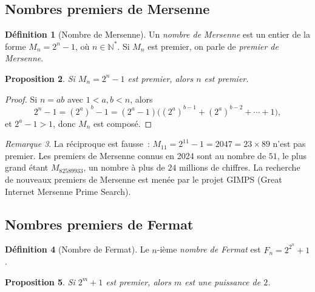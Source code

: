 \documentclass[12pt,a4paper,openany]{book}
\theoremstyle{definition}
\newtheorem{definition}{Définition}[chapter]
\theoremstyle{plain}
\newtheorem{proposition}[definition]{Proposition}
\theoremstyle{remark}
\newtheorem{remarque}[definition]{Remarque}
\newcommand{\N}{\mathbb{N}}
\begin{document}
\subsection{Nombres premiers de Mersenne}
\label{subsec:ch2:mersenne}


\begin{definition}[Nombre de Mersenne]
\label{def:mersenne}
Un \emph{nombre de Mersenne} est un entier de la forme
$M_n = 2^n - 1$, où $n \in \N^*$. Si $M_n$ est premier, on parle de
\emph{premier de Mersenne}.
\end{definition}

\begin{proposition}
\label{prop:mersenne:necessaire}
Si $M_n = 2^n - 1$ est premier, alors $n$ est premier.
\end{proposition}

\begin{proof}
Si $n = ab$ avec $1 < a, b < n$, alors
\[
  2^n - 1 = (2^a)^b - 1 = (2^a - 1)\bigl((2^a)^{b-1} + (2^a)^{b-2} + \cdots + 1\bigr),
\]
et $2^a - 1 > 1$, donc $M_n$ est composé.
\end{proof}

\begin{remarque}
\label{rem:mersenne:liste}
La réciproque est fausse~: $M_{11} = 2^{11} - 1 = 2047 = 23 \times 89$ n'est pas
premier. Les premiers de Mersenne connus en 2024 sont au nombre de $51$, le plus
grand étant $M_{82589933}$, un nombre à plus de $24$ millions de chiffres. La
recherche de nouveaux premiers de Mersenne est menée par le projet
GIMPS (Great Internet Mersenne Prime Search).
\end{remarque}

\subsection{Nombres premiers de Fermat}
\label{subsec:ch2:fermat}


\begin{definition}[Nombre de Fermat]
\label{def:fermat_number}
Le $n$-ième \emph{nombre de Fermat} est $F_n = 2^{2^n} + 1$.
\end{definition}

\begin{proposition}
\label{prop:fermat:necessaire}
Si $2^m + 1$ est premier, alors $m$ est une puissance de $2$.
\end{proposition}
\end{document}
